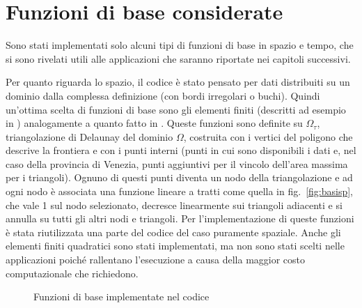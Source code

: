 \documentclass[a4paper,11pt,twoside,openright]{book}							%
\begin{document}
\section{Funzioni di base considerate}
Sono stati implementati solo alcuni tipi di funzioni di base in spazio e tempo, che si sono rivelati utili alle applicazioni che saranno riportate nei capitoli successivi. 

Per quanto riguarda lo spazio, il codice è stato pensato per dati distribuiti su un dominio dalla complessa definizione (con bordi irregolari o buchi). Quindi un'ottima scelta di funzioni di base sono gli elementi finiti (descritti ad esempio in \cite{art:quarteroni}) analogamente a quanto fatto in \cite{art:sangalli}. Queste funzioni sono definite su $\Omega_{\tau}$, triangolazione di Delaunay del dominio $\Omega$, costruita con i vertici del poligono che descrive la frontiera e con i punti interni (punti in cui sono disponibili i dati e, nel caso della provincia di Venezia, punti aggiuntivi per il vincolo dell'area massima per i triangoli). Ognuno di questi punti diventa un nodo della triangolazione e ad ogni nodo è associata una funzione lineare a tratti come quella in fig.~\ref{fig:basisp}, che vale 1 sul nodo selezionato, decresce linearmente sui triangoli adiacenti e si annulla su tutti gli altri nodi e triangoli. Per l'implementazione di queste funzioni è stata riutilizzata una parte del codice del caso puramente spaziale. Anche gli elementi finiti quadratici sono stati implementati, ma non sono stati scelti nelle applicazioni poiché rallentano l'esecuzione a causa della maggior costo computazionale che richiedono.

\begin{figure}[t]
	\centering
	\caption{Funzioni di base implementate nel codice}
	\label{fig:basi}
\end{figure}
\end{document}
